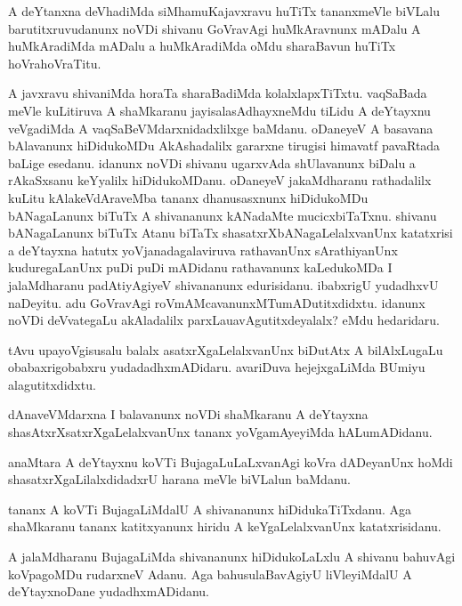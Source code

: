 \documentclass{article}
\begin{document}
\begin{mn}%
A deYtanxna deVhadiMda siMhamuKajavxravu huTiTx tananxmeVle biVLalu barutitxruvudanunx noVDi 
shivanu GoVravAgi huMkAravnunx mADalu A huMkAradiMda mADalu a huMkAradiMda oMdu sharaBavun 
huTiTx hoVrahoVraTitu.
\end{mn}

\begin{mn}%
A javxravu shivaniMda horaTa sharaBadiMda kolalxlapxTiTxtu. vaqSaBada meVle kuLitiruva A 
shaMkaranu jayisalasAdhayxneMdu tiLidu A deYtayxnu veVgadiMda A vaqSaBeVMdarxnidadxlilxge 
baMdanu. oDaneyeV A basavana bAlavanunx hiDidukoMDu AkAshadalilx gararxne tirugisi himavatf 
pavaRtada baLige  esedanu. idanunx noVDi shivanu ugarxvAda shUlavanunx biDalu a rAkaSxsanu 
keYyalilx hiDidukoMDanu. oDaneyeV jakaMdharanu rathadalilx kuLitu kAlakeVdAraveMba tananx 
dhanusasxnunx hiDidukoMDu bANagaLanunx biTuTx A shivananunx kANadaMte mucicxbiTaTxnu. 
shivanu bANagaLanunx biTuTx Atanu biTaTx shasatxrXbANagaLelalxvanUnx katatxrisi a deYtayxna  
hatutx yoVjanadagalaviruva rathavanUnx sArathiyanUnx kuduregaLanUnx puDi puDi 
mADidanu rathavanunx kaLedukoMDa I jalaMdharanu padAtiyAgiyeV shivananunx edurisidanu. 
ibabxrigU yudadhxvU naDeyitu. adu GoVravAgi roVmAMcavanunxMTumADutitxdidxtu. idanunx noVDi 
deVvategaLu akAladalilx parxLauavAgutitxdeyalalx? eMdu hedaridaru.
\end{mn}

\begin{mn}%
tAvu upayoVgisusalu balalx asatxrXgaLelalxvanUnx biDutAtx A bilAlxLugaLu obabaxrigobabxru 
yudadadhxmADidaru. avariDuva  hejejxgaLiMda BUmiyu alagutitxdidxtu.
\end{mn}

\begin{mn}%
dAnaveVMdarxna I balavanunx noVDi shaMkaranu A deYtayxna shasAtxrXsatxrXgaLelalxvanUnx 
tananx yoVgamAyeyiMda hALumADidanu.
\end{mn}

\begin{mn}%
anaMtara A deYtayxnu koVTi BujagaLuLaLxvanAgi koVra dADeyanUnx hoMdi 
shasatxrXgaLilalxdidadxrU harana meVle biVLalun baMdanu.
\end{mn}

\begin{mn}%
tananx A koVTi BujagaLiMdalU A shivananunx hiDidukaTiTxdanu. Aga shaMkaranu tananx 
katitxyanunx hiridu A keYgaLelalxvanUnx katatxrisidanu.
\end{mn}

\begin{mn}%
A jalaMdharanu BujagaLiMda shivananunx hiDidukoLaLxlu A shivanu bahuvAgi koVpagoMDu 
rudarxneV Adanu. Aga bahusulaBavAgiyU liVleyiMdalU A deYtayxnoDane yudadhxmADidanu.
\end{mn}
\end{document}
